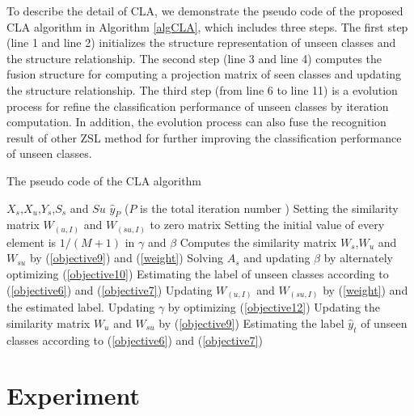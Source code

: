 \documentclass[review]{elsarticle}
\begin{document}
To describe the detail of CLA, we demonstrate the pseudo code of the proposed CLA algorithm in Algorithm \ref{algCLA}, which includes three steps. The first step (line 1 and line 2) initializes the structure representation of unseen classes and the structure relationship. The second step (line 3 and line 4) computes the fusion structure for computing a projection matrix of seen classes and updating the structure relationship. The third step (from line 6 to line 11) is a evolution process for refine the classification performance of unseen classes by iteration computation. In addition, the evolution process can also fuse the recognition result of other ZSL method for further improving the classification performance of unseen classes.
\begin{algorithm}[ht]
  \caption{The pseudo code of the CLA algorithm}
 \begin{algorithmic}[1]
 \label{algCLA}
\renewcommand{\algorithmicrequire}{\textbf{Input:}}
\renewcommand{\algorithmicensure}{\textbf{Output:}}
\renewcommand{\algorithmicreturn}{\textbf{Iteration:}}
   \REQUIRE $X_{s}$,$X_{u}$,$Y_{s}$,$S_{s}$ and $S{u}$
   \ENSURE $\hat{y}_{P}$ ($P$ is the total iteration number )
   \STATE Setting the similarity matrix $W_{(u,I)}$ and $W_{(su,I)}$ to zero matrix
   \STATE Setting the initial value of every element is $1/(M+1)$ in $\gamma$ and $\beta$
   \STATE Computes the similarity matrix $W_{s}$,$W_{u}$ and $W_{su}$ by (\ref{objective9}) and (\ref{weight})
   \STATE Solving $A_{s}$ and updating $\beta$ by alternately optimizing (\ref{objective10})
   \STATE Estimating the label of unseen classes according to (\ref{objective6}) and (\ref{objective7})
   \STATE Updating $W_{(u,I)}$ and $W_{(su,I)}$ by (\ref{weight}) and the estimated label.
   \STATE Updating $\gamma$ by optimizing (\ref{objective12})
   \STATE Updating the similarity matrix $W_{u}$ and $W_{su}$ by (\ref{objective9})
   \STATE Estimating the label $\hat{y}_{t}$ of unseen classes according to (\ref{objective6}) and (\ref{objective7})
   \ENDFOR
  \end{algorithmic}
\end{algorithm}
\section{Experiment}
\end{document}
